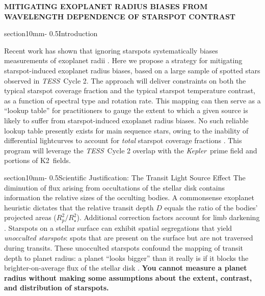 \documentclass[letterpaper,11pt]{article}
\makeatletter
\renewcommand{\section}{\@startsection%
{section}{1}{0mm}{-\baselineskip}%
{0.5\baselineskip}{\normalfont\Large\bfseries}}%
\newcommand{\tess}{{\it TESS}}
\newcommand{\kepler}{{\it Kepler}}
\newcommand{\ktwo}{{K2}}
\makeatother
\begin{document}
\pagestyle{plain}
\setlength{\bibsep}{0.0pt}
\let\oldbibliography\thebibliography
\renewcommand{\thebibliography}[1]{%
  \oldbibliography{#1}%
  \setlength{\itemsep}{0pt}%
}




\begin{center}
\bfseries\uppercase{%
Mitigating exoplanet radius biases from wavelength dependence of starspot contrast
}
\end{center}




\section{Introduction}

Recent work has shown that ignoring starspots systematically biases measurements of exoplanet radii \citep{2018ApJ...853..122R}.  Here we propose a strategy for mitigating starspot-induced exoplanet radius biases, based on a large sample of spotted stars observed in \tess\ Cycle 2.  The approach will deliver constraints on both the typical starspot coverage fraction and the typical starspot temperature contrast, as a function of spectral type and rotation rate.  This mapping can then serve as a ``lookup table'' for practitioners to gauge the extent to which a given source is likely to suffer from starspot-induced exoplanet radius biases.  No such reliable lookup table presently exists for main sequence stars, owing to the inability of differential lightcurves to account for \emph{total} starspot coverage fractions \citep{2018ApJ...865..142B}.  This program will leverage the \tess\ Cycle 2 overlap with the \kepler\ prime field and portions of \ktwo\ fields.

\section{Scientific Justification: The Transit Light Source Effect}
The diminution of flux arising from occultations of the stellar disk contains information the relative sizes of the occulting bodies.  A commonsense exoplanet heuristic dictates that the relative transit depth $D$ equals the ratio of the bodies' projected areas ($R_p^2/R_\star^2$).  Additional correction factors account for limb darkening \citep{2002ApJ...580L.171M}.  Starspots on a stellar surface can exhibit spatial segregations
that yield \emph{unocculted starspots}: spots that are present on the surface but are not traversed during transits.  These unocculted starspots confound the mapping of transit depth to planet radius: a planet ``looks bigger'' than it really is if it blocks the brighter-on-average flux of the stellar disk \citep{2018AJ....156...91M}.  \textbf{You cannot measure a planet radius without making some assumptions about the extent, contrast, and distribution of starspots.}
\end{document}
